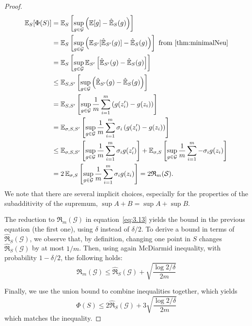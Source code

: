 \begin{proof}
\begin{align}
\mathbb{E}_{S}[\Phi(S)] &= \mathbb{E}_{S} \left[ \sup_{g \in \mathcal{G}} \left( \mathbb{E}[g] - \hat{\mathbb{E}}_S(g) \right) \right] \\
& = \mathbb{E}_{S} \left[ \sup_{g \in \mathcal{G}} \left( \mathbb{E}_{S'}[\hat{\mathbb{E}}_{S'}(g)] - \hat{\mathbb{E}}_S(g) \right) \right] \text{ from \ref{thm:minimalNeu}}\\
&= \mathbb{E}_{S} \left[\sup_{g \in \mathcal{G}} \mathbb{E}_{S'} \left[ \hat{\mathbb{E}}_{S'}(g) - \hat{\mathbb{E}}_S(g) \right]\right] \\
&\leq \mathbb{E}_{S,S'} \left[ \sup_{g \in \mathcal{G}} \left( \hat{\mathbb{E}}_{S'}(g) - \hat{\mathbb{E}}_S(g) \right) \right]  \\
&= \mathbb{E}_{S,S'} \left[ \sup_{g \in \mathcal{G}} \frac{1}{m} \sum_{i=1}^{m} \left( g(z_i') - g(z_i) \right) \right] \\
&= \mathbb{E}_{\sigma, S, S'} \left[ \sup_{g \in \mathcal{G}} \frac{1}{m} \sum_{i=1}^{m} \sigma_i \left( g(z_i') - g(z_i) \right) \right]  \\
&\leq \mathbb{E}_{\sigma, S, S'} \left[ \sup_{g \in \mathcal{G}} \frac{1}{m} \sum_{i=1}^{m} \sigma_i g(z_i') \right] + \mathbb{E}_{\sigma, S} \left[ \sup_{g \in \mathcal{G}} \frac{1}{m} \sum_{i=1}^{m} -\sigma_i g(z_i) \right] \\
&= 2 \, \mathbb{E}_{\sigma, S} \left[ \sup_{g \in \mathcal{G}} \frac{1}{m} \sum_{i=1}^{m} \sigma_i g(z_i) \right] = 2 \mathfrak{R}_m(\mathcal{S}). \label{eq:3.13}
\end{align}
We note that there are several implicit choices, especially for the properties of the subadditivity of the supremum, $\sup{A+B}=\sup{A}+\sup{B}$.

The reduction to $\mathfrak{R}_{m}(\mathcal{G})$ in equation~\ref{eq:3.13} yields the bound in the previous equation (the first one), using $\delta$ instead of $\delta/2$. To derive a bound in terms of $\hat{\mathfrak{R}}_{S}(\mathcal{G})$, we observe that, by definition, changing one point in $S$ changes $\hat{\mathfrak{R}}_{S}(\mathcal{G})$ by at most $1/m$. Then, using again McDiarmid inequality, with probability $1-\delta/2$, the following holds: 
\begin{equation}
    \mathfrak{R}_{m}(\mathcal{G}) \leq \hat{\mathfrak{R}}_{S}(\mathcal{G}) + \sqrt{\frac{\log{2/\delta}}{2m}}
\end{equation}

Finally, we use the union bound to combine inequalities together, which yields 
\begin{equation}
    \Phi(S) \leq 2 \hat{\mathfrak{R}}_{S}(\mathcal{G}) + 3\sqrt{\frac{\log{2/\delta}}{2m}}
\end{equation}
which matches the inequality. 
\end{proof}


